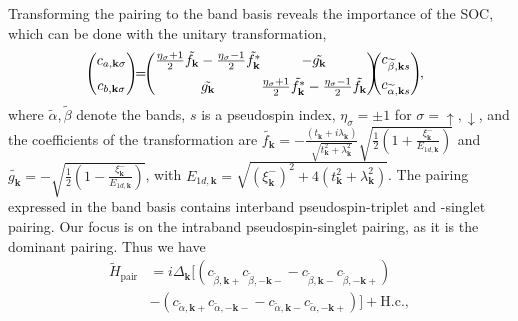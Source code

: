 \documentclass[%
reprint,
superscriptaddress,
 amsmath,amssymb,
 aps,
prb,
nobalancelastpage,
]{revtex4-2}
\begin{document}
Transforming the pairing to the band basis reveals the importance of the SOC, which can be done with the unitary transformation,
\begin{equation}    \label{first_trsf}
\begin{aligned}
\hspace{-2.5mm}
\begin{pmatrix}
   c_{a,\textbf{k}\sigma} \\[6pt]
   c_{b,\textbf{k}\sigma} \\
 \end{pmatrix}\hspace{-1.5mm}
 \setlength\arraycolsep{0.01mm}
 = \hspace{-1.5mm}\begin{pmatrix} 
    \frac{\eta_{\sigma}+1}{2}\tilde{f_{\textbf{k}}}-\frac{\eta_{\sigma}-1}{2}\tilde{f_{\textbf{k}}^{*}} & -\tilde{g_{\textbf{k}}}  \\[6pt]
  \tilde{g_{\textbf{k}}} & \frac{\eta_{\sigma}+1}{2}\tilde{f_{\textbf{k}}^{*}}-\frac{\eta_{\sigma}-1}{2}\tilde{f_{\textbf{k}}}
\end{pmatrix}\hspace{-2.5mm}
\begin{pmatrix}
   c_{\widetilde{\beta},\textbf{k}s} \\[6pt]
   c_{\widetilde{\alpha},\textbf{k}s} \\
 \end{pmatrix}\hspace{-1mm},
\end{aligned}
\end{equation}
where $\widetilde{\alpha},\widetilde{\beta}$ denote the bands, $s$ is a pseudospin index, $\eta_{\sigma}=\pm1$ for $\sigma=\uparrow,\downarrow$, and the coefficients of the transformation are $\tilde{f_{\textbf{k}}} = -\frac{(t_{\textbf{k}}+i\lambda_{\textbf{k}})}{\sqrt{t_{\textbf{k}}^2 + \lambda_{\textbf{k}}^2}}\sqrt{\frac{1}{2}(1 + \frac{\xi_{\textbf{k}}^{-}}{E_{1d,\textbf{k}}})}$ and $\tilde{g_{\textbf{k}}} = -\sqrt{\frac{1}{2}(1-\frac{\xi_{\textbf{k}}^{-}}{E_{1d,\textbf{k}}})}$, with $E_{1d,\textbf{k}}=\sqrt{(\xi_{\textbf{k}}^{-})^2 + 4(t_{\textbf{k}}^2+\lambda_{\textbf{k}}^2)}$. The pairing expressed in the band basis contains interband pseudospin-triplet and -singlet pairing. Our focus is on the intraband pseudospin-singlet pairing, as it is the dominant pairing. Thus we have
\begin{equation}    \label{pairing_two_orb}
\begin{aligned}
    \widetilde{H}_{\text{pair}} &= i\Delta_{\textbf{k}}\bigl[(c_{\widetilde{\beta},\textbf{k}+}c_{\widetilde{\beta},-\textbf{k}-} -c_{\widetilde{\beta},\textbf{k}-}c_{\widetilde{\beta},-\textbf{k}+}) \\[6pt]&- (c_{\widetilde{\alpha},\textbf{k}+}c_{\widetilde{\alpha},-\textbf{k}-} -c_{\widetilde{\alpha},\textbf{k}-}c_{\widetilde{\alpha},-\textbf{k}+})\bigr] + \text{H.c.},
\end{aligned}
\end{equation}
\end{document}
